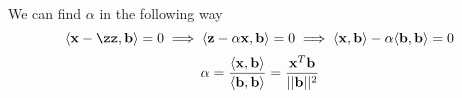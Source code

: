     
    
    
    We can find $\alpha$ in the following way
    $$ \langle\vec{x} - \zz, \vec{b}\rangle = 0 \implies \langle\vec{z} - \alpha\vec{x}, \vec{b}\rangle = 0 \implies \langle\vec{x}, \vec{b}\rangle - \alpha\langle\vec{b}, \vec{b}\rangle = 0 $$
    $$ \alpha = \frac{\langle\mathbf{x}, \mathbf{b}\rangle}{\langle\mathbf{b}, \mathbf{b}\rangle} = \frac{\mathrm{\mathbf{x}}^T\mathbf{b}}{||\mathbf{b}||^2} $$
